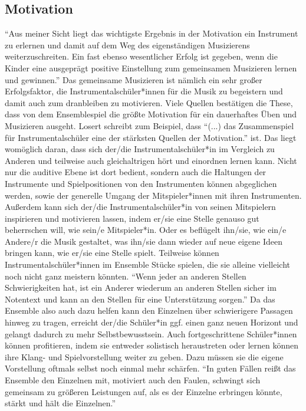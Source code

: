 \subsection{Motivation}

\enquote{Aus meiner Sicht liegt das wichtigste Ergebnis in der Motivation ein
Instrument zu erlernen und damit auf dem Weg des eigenständigen Musizierens
weiterzuschreiten. Ein fast ebenso wesentlicher Erfolg ist gegeben, wenn die
Kinder eine ausgeprägt positive Einstellung zum gemeinsamen Musizieren lernen
und gewinnen.}\autocite[40]{ernst:die_zukunftsfaehige_musikschule} Das
gemeinsame Musizieren ist nämlich ein sehr großer Erfolgsfaktor, die
Instrumentalschüler*innen für die Musik zu begeistern und damit auch zum
dranbleiben zu motivieren. Viele Quellen bestätigen die These, dass von dem
Ensemblespiel die größte Motivation für ein dauerhaftes Üben und Musizieren
ausgeht. Losert schreibt zum Beispiel, dass \enquote{(...) das Zusammenspiel für
Instrumentalschüler eine der stärksten Quellen der Motivation.} ist.
\autocite[92]{losert:die_kunst_zu_unterrichten} Das liegt womöglich daran, dass
sich der/die Instrumentalschüler*in im Vergleich zu Anderen und teilweise auch
gleichaltrigen hört und einordnen lernen kann. Nicht nur die auditive Ebene ist
dort bedient, sondern auch die Haltungen der Instrumente und Spielpositionen von
den Instrumenten können abgeglichen werden, sowie der generelle Umgang der
Mitspieler*innen mit ihren Instrumenten. Außerdem kann sich der/die
Instrumentalschüler*in von seinen Mitspielern inspirieren und motivieren lassen,
indem er/sie eine Stelle genauso gut beherrschen will, wie sein/e Mitspieler*in. Oder es
beflügelt ihn/sie, wie ein/e Andere/r die Musik gestaltet, was ihn/sie dann wieder auf neue
eigene Ideen bringen kann, wie er/sie eine Stelle spielt. Teilweise können
Instrumentalschüler*innen im Ensemble Stücke spielen, die sie alleine vielleicht
noch nicht ganz meistern könnten. \enquote{Wenn jeder an anderen Stellen
Schwierigkeiten hat, ist ein Anderer wiederum an anderen Stellen sicher im
Notentext und kann an den Stellen für eine Unterstützung sorgen.}
\autocite[32]{losert:die_kunst_zu_unterrichten}
Da das Ensemble also auch dazu helfen kann den Einzelnen über schwierigere
Passagen hinweg zu tragen, erreicht der/die Schüler*in ggf. einen ganz neuen Horizont
und gelangt dadurch zu mehr Selbstbewusstsein. Auch fortgeschrittene Schüler*innen
können profitieren, indem sie entweder solistisch heraustreten oder
lernen können ihre Klang- und Spielvorstellung weiter zu geben. Dazu müssen sie
die eigene Vorstellung oftmals selbst noch einmal mehr schärfen. \enquote{In
guten Fällen reißt das Ensemble den Einzelnen mit, motiviert auch den Faulen,
schwingt sich gemeinsam zu größeren Leistungen auf, als es der Einzelne
erbringen könnte, stärkt und hält die Einzelnen.}
